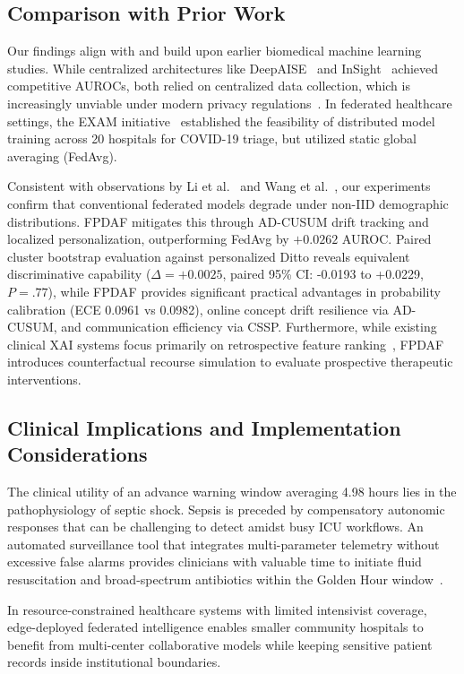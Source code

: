\documentclass[11pt,a4paper]{article}
\begin{document}
\subsection{Comparison with Prior Work}
Our findings align with and build upon earlier biomedical machine learning studies. While centralized architectures like DeepAISE~\cite{shashikumar2021deepai} and InSight~\cite{desautels2016prediction} achieved competitive AUROCs, both relied on centralized data collection, which is increasingly unviable under modern privacy regulations~\cite{kaissis2020trustworthy}. In federated healthcare settings, the EXAM initiative~\cite{dayan2021exam} established the feasibility of distributed model training across 20 hospitals for COVID-19 triage, but utilized static global averaging (FedAvg). 

Consistent with observations by Li et al.~\cite{li2020fedprox} and Wang et al.~\cite{wang2025personalized}, our experiments confirm that conventional federated models degrade under non-IID demographic distributions. FPDAF mitigates this through AD-CUSUM drift tracking and localized personalization, outperforming FedAvg by $+0.0262$ AUROC. Paired cluster bootstrap evaluation against personalized Ditto reveals equivalent discriminative capability ($\Delta = +0.0025$, paired 95\% CI: -0.0193 to +0.0229, $P = .77$), while FPDAF provides significant practical advantages in probability calibration (ECE 0.0961 vs 0.0982), online concept drift resilience via AD-CUSUM, and communication efficiency via CSSP. Furthermore, while existing clinical XAI systems focus primarily on retrospective feature ranking~\cite{lundberg2018explainable,choi2016retain}, FPDAF introduces counterfactual recourse simulation to evaluate prospective therapeutic interventions.

\subsection{Clinical Implications and Implementation Considerations}
The clinical utility of an advance warning window averaging 4.98 hours lies in the pathophysiology of septic shock. Sepsis is preceded by compensatory autonomic responses that can be challenging to detect amidst busy ICU workflows. An automated surveillance tool that integrates multi-parameter telemetry without excessive false alarms provides clinicians with valuable time to initiate fluid resuscitation and broad-spectrum antibiotics within the Golden Hour window~\cite{evans2021surviving}.

In resource-constrained healthcare systems with limited intensivist coverage, edge-deployed federated intelligence enables smaller community hospitals to benefit from multi-center collaborative models while keeping sensitive patient records inside institutional boundaries.
\end{document}
